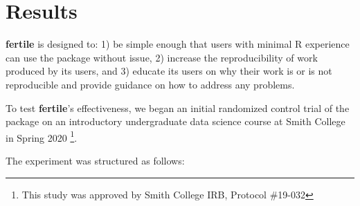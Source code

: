\documentclass[APA,LATO1COL]{WileyNJD-v2}\usepackage[]{graphicx}\usepackage[]{color}
\newcommand{\R}{\textsf{R}\xspace}
\newcommand{\pkg}[1]{\textbf{#1}}
\begin{document}
\section{Results}

\pkg{fertile} is designed to: 1) be simple enough that users with minimal \R experience can use the package without issue, 2) increase the reproducibility of work produced by its users, and 3) educate its users on why their work is or is not reproducible and provide guidance on how to address any problems.

To test \pkg{fertile}'s effectiveness, we began an initial randomized control trial of the package on an introductory undergraduate data science course at Smith College in Spring 2020 \footnote{This study was approved by Smith College IRB, Protocol \#19-032}.

The experiment was structured as follows:
\end{document}
